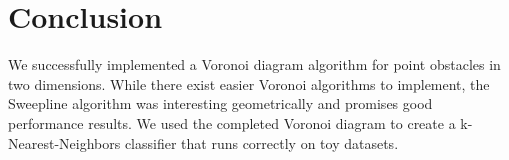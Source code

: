 \documentclass[conference]{IEEEtran}
\begin{document}
%




\section{Conclusion}
We successfully implemented a Voronoi diagram algorithm for point
obstacles in two dimensions. While there exist easier Voronoi algorithms
to implement, the Sweepline algorithm was interesting geometrically
and promises good performance results. We used the completed Voronoi
diagram to create a k-Nearest-Neighbors classifier that runs correctly
on toy datasets.


\end{document}
